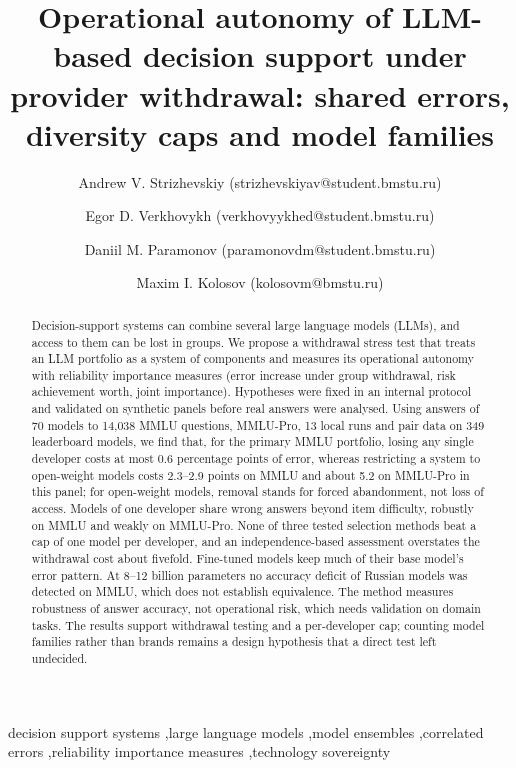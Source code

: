 \documentclass[preprint,12pt,authoryear]{elsarticle}
\begin{document}
\begin{frontmatter}

\title{Operational autonomy of LLM-based decision support under provider withdrawal: shared errors, diversity caps and model families}

\author{Andrew V. Strizhevskiy (strizhevskiyav@student.bmstu.ru)}
\author{Egor D. Verkhovykh (verkhovyykhed@student.bmstu.ru)}
\author{Daniil M. Paramonov (paramonovdm@student.bmstu.ru)}
\author{Maxim I. Kolosov (kolosovm@bmstu.ru)}
\address{Bauman Moscow State Technical University, Moscow, Russia}

\begin{abstract}
Decision-support systems can combine several large language models (LLMs), and access to them can be lost in groups. We propose a withdrawal stress test that treats an LLM portfolio as a system of components and measures its operational autonomy with reliability importance measures (error increase under group withdrawal, risk achievement worth, joint importance). Hypotheses were fixed in an internal protocol and validated on synthetic panels before real answers were analysed. Using answers of 70 models to 14,038 MMLU questions, MMLU-Pro, 13 local runs and pair data on 349 leaderboard models, we find that, for the primary MMLU portfolio, losing any single developer costs at most 0.6 percentage points of error, whereas restricting a system to open-weight models costs 2.3--2.9 points on MMLU and about 5.2 on MMLU-Pro in this panel; for open-weight models, removal stands for forced abandonment, not loss of access. Models of one developer share wrong answers beyond item difficulty, robustly on MMLU and weakly on MMLU-Pro. None of three tested selection methods beat a cap of one model per developer, and an independence-based assessment overstates the withdrawal cost about fivefold. Fine-tuned models keep much of their base model's error pattern. At 8--12 billion parameters no accuracy deficit of Russian models was detected on MMLU, which does not establish equivalence. The method measures robustness of answer accuracy, not operational risk, which needs validation on domain tasks. The results support withdrawal testing and a per-developer cap; counting model families rather than brands remains a design hypothesis that a direct test left undecided.
\end{abstract}

\begin{keyword}
decision support systems \sep large language models \sep model ensembles \sep correlated errors \sep reliability importance measures \sep technology sovereignty
\end{keyword}

\end{frontmatter}
\end{document}
